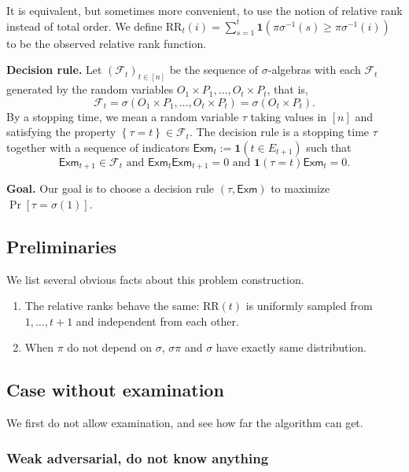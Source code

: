It is equivalent, but sometimes more convenient, to use the notion of relative rank instead of total order. We define $\text{RR}_t(i)=\sum_{s=1}^t \mathbf{1}\left( \pi\sigma^{-1}(s)\ge \pi\sigma^{-1}(i) \right) $ to be the observed relative rank function.

\textbf{Decision rule.} Let $\left( \mathcal{F}_t \right)_{t \in [n]}$ be the sequence of $\sigma$-algebras with each $\mathcal{F}_t$ generated by the random variables $O_1 \times P_1, \ldots, O_t \times P_t$, that is, \[
\mathcal{F}_t = \sigma\left( O_1 \times P_1, \ldots, O_t \times P_t \right) =\sigma\left( O_t \times P_t \right) 
.\]  
By a stopping time, we mean a random variable $\tau$ taking values in $[n]$ and satisfying the property $\left\{ \tau=t  \right\} \in \mathcal{F}_t$. The decision rule is a stopping time $\tau$ together with a sequence of indicators $\textsf{Exm}_t :=\mathbf{1}(t \in E_{t+1})$ such that \[
	\textsf{Exm}_{t+1} \in \mathcal{F}_t \text{ and } \textsf{Exm}_{t}\textsf{Exm}_{t+1} = 0 \text{ and } \mathbf{1}\left( \tau = t  \right) \textsf{Exm}_t = 0
.\]

\textbf{Goal.} Our goal is to choose a decision rule $\left( \tau, \textsf{Exm} \right) $ to maximize $\operatorname{Pr}\left[{\tau=\sigma(1)}\right]$.

\subsection{Preliminaries}

	We list several obvious facts about this problem construction.
\begin{lemma}
\label{partial-adversarial-obv-facts}
	\begin{enumerate}
		\item The relative ranks behave the same:  $\text{RR}(t)$ is uniformly sampled from $1, \ldots,t+1$ and independent from each other.
		\item When $\pi$ do not depend on $\sigma$, $\sigma \pi$ and $\sigma$ have exactly same distribution.
	\end{enumerate}
\end{lemma}

\subsection{Case without examination}

We first do not allow examination, and see how far the algorithm can get.

\subsubsection{Weak adversarial, do not know anything}

